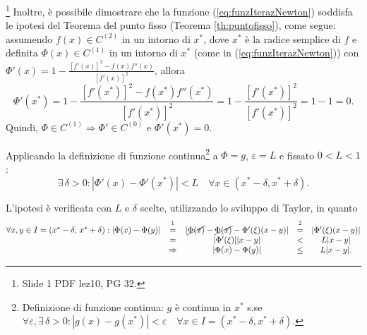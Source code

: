 \addtocounter{footnote}{-4}





\noindent\footnote{Slide 1 PDF lez10, PG 32.} Inoltre, è possibile dimostrare che la funzione (\ref{eq:funzIterazNewton}) soddisfa le ipotesi del Teorema del punto fisso (Teorema \ref{th:puntofisso}), come segue: assumendo $f(x)\in C^{(2)}$ in un intorno di $x^*$, dove $x^*$ è la radice semplice di $f$ e definita $\Phi(x)\in C^{(1)}$ in un intorno di $x^*$ (come in (\ref{eq:funzIterazNewton})) con $\Phi'(x)=1-\frac{[f'(x)]^2-f(x)f''(x)}{[f'(x)]^2}$, allora
\begin{equation*}
	\Phi'(x^*)=1-\frac{[f'(x^*)]^2-f(x^*)f''(x^*)}{[f'(x^*)]^2}=1-\frac{[f'(x^*)]^2}{[f'(x^*)]^2}=1-1=0.
\end{equation*}
Quindi, $\Phi\in C^{(1)}\Rightarrow\Phi'\in C^{(0)}$ e $\Phi'(x^*)=0$.

Applicando la definizione di funzione continua\footnote{Definizione di funzione continua: $g$ è continua in $x^*$ s.se $\forall\varepsilon, \exists\,\delta>0:|g(x)-g(x^*)|<\varepsilon\quad\forall x\in I=(x^*-\delta,x^*+\delta)$.} a $\Phi=g$, $\varepsilon =L$ e fissato $0<L<1$:
\begin{equation*}
	\exists\,\delta>0:|\Phi'(x)-\Phi'(x^*)|<L \quad\forall x\in (x^*-\delta,x^*+\delta).
\end{equation*}


L'ipotesi è verificata con $L$ e $\delta$ scelte, utilizzando lo sviluppo di Taylor, in quanto
\begin{equation*}
	\begin{matrix}
		\forall x,y \in I=(x^*-\delta,\, x^*+\delta): |\Phi(x)-\Phi(y)| &\overset{\footnotemark}{=}& |\cancel{\Phi(x)}-\cancel{\Phi(x)}-\Phi'(\xi)(x-y)|  &\overset{\footnotemark}{=}& |\Phi'(\xi)(x-y)| \\
		&=& |\Phi'(\xi)||x-y| &<& L|x-y|\\
		&\Rightarrow&|\Phi(x)-\Phi(y)|&\leq& L|x-y|.
	\end{matrix}
\end{equation*}

